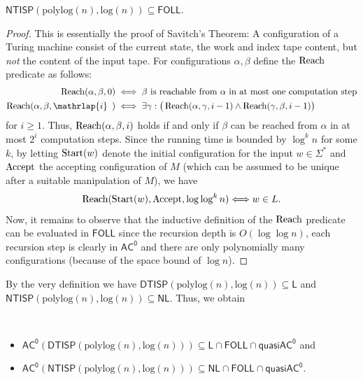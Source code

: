 \documentclass{theoretics}
\newcommand{\Reach}{\mathop{
 			\mbox{{\fontfamily{cmr}\fontseries{m}\fontshape{n}\selectfont
 					Reach}}}\nolimits}
\newcommand{\Accept}{\mathop{
 			\mbox{{\fontfamily{cmr}\fontseries{m}\fontshape{n}\selectfont
 					Accept}}}\nolimits}
\newcommand{\Start}{\mathop{
 			\mbox{{\fontfamily{cmr}\fontseries{m}\fontshape{n}\selectfont
 					Start}}}\nolimits}
\newcommand{\Oh}{O}
\newcommand*{\ComplexityClass}[1]{\ensuremath{\mathsf{#1}}\xspace}
\newcommand*{\NL}{\ComplexityClass{NL}}
\newcommand{\NTISP}{\ComplexityClass{NTISP}}
\newcommand{\DTISP}{\ComplexityClass{DTISP}}
\newcommand{\NTISPpll}{\ensuremath{\NTISP(\mathrm{polylog}(n),\mathrm{log}(n))}\xspace}
\newcommand{\DTISPpll}{\ensuremath{\DTISP(\mathrm{polylog}(n),\mathrm{log}(n))}\xspace}
\newcommand{\ACz}{\ComplexityClass{AC^0}}
\newcommand{\qACz}{\ComplexityClass{quasiAC^0}}
\newcommand{\FOLL}{\ComplexityClass{FOLL}}
\newcommand{\LOGSPACE}{\ComplexityClass{L}} %
\begin{document}
\begin{lemma}\label{lem:DTISPFoll}
   $ \NTISPpll \subseteq \FOLL$.
\end{lemma}
\begin{proof}
    This is essentially the proof of Savitch's Theorem: A configuration of a Turing machine consist of the current state, the work and index tape content, but \emph{not} the content of the input tape. For configurations $\alpha, \beta $ define the $\Reach$ predicate as follows:
 	\begin{align*}
 \Reach(\alpha, \beta, 0)
 		&\iff \beta \text{ is reachable from $\alpha$ in at most one computation step} \\
 \Reach(\alpha, \beta, \mathrlap{i}\phantom{0})
 		&\iff \exists \gamma: \big( \Reach(\alpha, \gamma, i-1) \wedge
 		\Reach(\gamma, \beta, i-1) \big)		
 	\end{align*}
	for $i \geq 1$.
 Thus, $\Reach(\alpha, \beta, i)$ holds if and only if $\beta$ can be reached from $\alpha$ in at most $2^i$ computation steps.
 	Since the running time is bounded by $\log^k n$ for some $k$, by letting $\Start(w)$  denote the initial configuration for the input $w \in \Sigma^*$ and $\Accept$ the accepting configuration of $M$ (which can be assumed to be unique after a suitable manipulation of $M$), we have 
 	\[ \Reach(\Start(w), \Accept, \log \log^k n) \Longleftrightarrow w \in L.\]
  Now, it remains to observe that the inductive definition of the $\Reach$ predicate can be evaluated in \FOLL since the recursion depth is $\Oh(\log\log n)$, each recursion step is clearly in $\ACz$ and there are only polynomially many configurations (because of the space bound of $\log n$).
\end{proof}



\noindent By the very definition we have $\DTISPpll \subseteq \LOGSPACE$ and $\NTISPpll \subseteq \NL$. Thus, we obtain
\begin{fact}\
   \begin{itemize}
    \item $\ACz(\DTISPpll) \subseteq \LOGSPACE \cap \FOLL \cap \qACz$ and
    \item $\ACz(\NTISPpll) \subseteq \NL \cap \FOLL \cap \qACz$.
\end{itemize} 
\end{fact}
\end{document}
